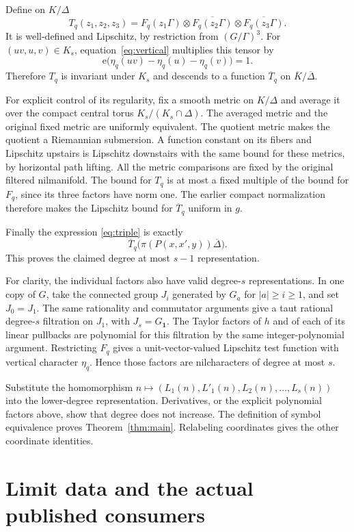 \documentclass[11pt]{article}
\newcommand{\one}{\mathbf 1}
\newcommand{\ee}{\mathrm e}
\begin{document}
Define on $K/\Delta$
\[
 T_q(z_1,z_2,z_3)=
 F_q(z_1\Gamma)\otimes\overline{F_q(z_2\Gamma)}
                    \otimes\overline{F_q(z_3\Gamma)}.
\]
It is well-defined and Lipschitz, by restriction from $(G/\Gamma)^3$.
For $(uv,u,v)\in K_s$, equation~\eqref{eq:vertical} multiplies this tensor
by
\[
 \ee\bigl(\eta_q(uv)-\eta_q(u)-\eta_q(v)\bigr)=1.
\]
Therefore $T_q$ is invariant under $K_s$ and descends to a function
$\overline T_q$ on $\overline K/\overline\Delta$.

For explicit control of its regularity, fix a smooth metric on $K/\Delta$
and average it over the compact central torus $K_s/(K_s\cap\Delta)$.
The averaged metric and the original fixed metric are uniformly equivalent.
The quotient metric makes the quotient a Riemannian submersion. A function
constant on its fibers and Lipschitz upstairs is Lipschitz downstairs with
the same bound for these metrics, by horizontal path lifting. All the
metric comparisons are fixed by the original filtered nilmanifold.
The bound for $T_q$ is at most a fixed multiple of the bound for $F_q$,
since its three factors have norm one. The earlier compact normalization
therefore makes the Lipschitz bound for $\overline T_q$ uniform in $g$.

Finally the expression \eqref{eq:triple} is exactly
\[
 \overline T_q\bigl(\pi(P(x,x',y))\overline\Delta\bigr).
\]
This proves the claimed degree at most $s-1$ representation.

For clarity, the individual factors also have valid degree-$s$
representations. In one copy of $G$, take the connected group $J_i$ generated
by $G_a$ for $|a|\geq i\geq1$, and set $J_0=J_1$.
The same rationality and commutator arguments give a taut rational degree-$s$
filtration on $J_1$, with $J_s=G_{\one}$. The Taylor factors of $h$ and of
each of its linear pullbacks are polynomial for this filtration by the same
integer-polynomial argument. Restricting $F_q$ gives a unit-vector-valued
Lipschitz test function with vertical character $\eta_q$.
Hence those factors are nilcharacters of degree at most $s$.

Substitute the homomorphism
$n\mapsto(L_1(n),L'_1(n),L_2(n),\ldots,L_s(n))$ into the lower-degree
representation. Derivatives, or the explicit polynomial factors above, show
that degree does not increase. The definition of symbol equivalence proves
Theorem~\ref{thm:main}. Relabeling coordinates gives the other coordinate
identities.

\section{Limit data and the actual published consumers}
\end{document}
